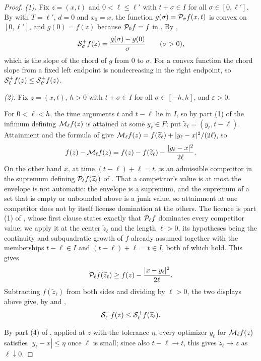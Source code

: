 \begin{proof}
\emph{(1).} Fix $z=(x,t)$ and $0<\ell\le\ell'$ with $t+\sigma\in I$ for all
$\sigma\in[0,\ell']$. By  with $T=\ell'$, $d=0$ and
$x_0=x$, the function $g(\sigma)=\mathcal{P}_\sigma f(x,t)$ is convex on
$[0,\ell']$, and $g(0)=f(z)$ because $\mathcal{P}_0f=f$ in . By
,
\[
  \mathcal{S}_\sigma^+f(z)=\frac{g(\sigma)-g(0)}{\sigma}\qquad(\sigma>0),
\]
which is the slope of the chord of $g$ from $0$ to $\sigma$. For a convex
function the chord slope from a fixed left endpoint is nondecreasing in the right
endpoint, so $\mathcal{S}_\ell^+f(z)\le\mathcal{S}_{\ell'}^+f(z)$.

\emph{(2).} Fix $z=(x,t)$, $h>0$ with $t+\sigma\in I$ for all $\sigma\in[-h,h]$,
and $\varepsilon>0$.

For $0<\ell<h$, the time arguments $t$ and $t-\ell$ lie in $I$, so by part (1)
of  the infimum defining $\mathcal{M}_\ell f(z)$ is attained
at some $y_\ell\in F$; put $\widetilde z_\ell=(y_\ell,t-\ell)$. Attainment and
the formula of  give
$\mathcal{M}_\ell f(z)=f(\widetilde z_\ell)+|y_\ell-x|^2/(2\ell)$, so
\[
  f(z)-\mathcal{M}_\ell f(z)
   =f(z)-f(\widetilde z_\ell)-\frac{|y_\ell-x|^2}{2\ell}.
\]
On the other hand $x$, at time $(t-\ell)+\ell=t$, is an admissible competitor in
the supremum defining $\mathcal{P}_\ell f(\widetilde z_\ell)$ of .
That a competitor's value is at most the envelope is not automatic: the envelope
is a supremum, and the supremum of a set that is empty or unbounded above is a
junk value, so attainment at one competitor does not by itself license
domination at the others. The licence is part (1) of
, whose first clause states exactly that
$\mathcal{P}_\ell f$ dominates every competitor value; we apply it at the center
$\widetilde z_\ell$ and the length $\ell>0$, its hypotheses being the continuity
and subquadratic growth of $f$ already assumed together with the memberships
$t-\ell\in I$ and $(t-\ell)+\ell=t\in I$, both of which hold. This gives
\[
  \mathcal{P}_\ell f(\widetilde z_\ell)
    \ge f(z)-\frac{|x-y_\ell|^2}{2\ell}.
\]
Subtracting $f(\widetilde z_\ell)$ from both sides and dividing by $\ell>0$,
the two displays above give, by  and ,
\begin{equation}\label{eq:eso-cross}
  \mathcal{S}_\ell^-f(z)\le\mathcal{S}_\ell^+f(\widetilde z_\ell).
\end{equation}

By part (4) of , applied at $z$ with the tolerance
$\eta$, every optimizer $y_\ell$ for $\mathcal{M}_\ell f(z)$ satisfies
$|y_\ell-x|\le\eta$ once $\ell$ is small; since also $t-\ell\to t$, this gives
$\widetilde z_\ell\to z$ as $\ell\downarrow0$.


\end{proof}

